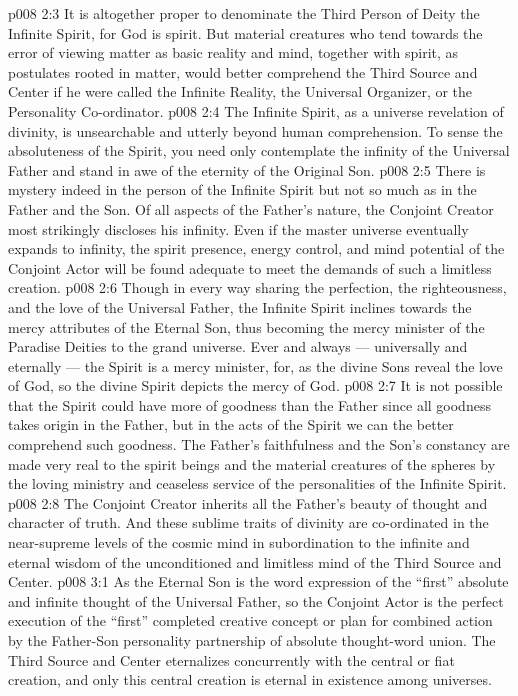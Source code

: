 \vs p008 2:3 It is altogether proper to denominate the Third Person of Deity the Infinite Spirit, for God is spirit. But material creatures who tend towards the error of viewing matter as basic reality and mind, together with spirit, as postulates rooted in matter, would better comprehend the Third Source and Center if he were called the Infinite Reality, the Universal Organizer, or the Personality Co\hyp{}ordinator.
\vs p008 2:4 \pc The Infinite Spirit, as a universe revelation of divinity, is unsearchable and utterly beyond human comprehension. To sense the absoluteness of the Spirit, you need only contemplate the infinity of the Universal Father and stand in awe of the eternity of the Original Son.
\vs p008 2:5 \pc There is mystery indeed in the person of the Infinite Spirit but not so much as in the Father and the Son. Of all aspects of the Father’s nature, the Conjoint Creator most strikingly discloses his infinity. Even if the master universe eventually expands to infinity, the spirit presence, energy control, and mind potential of the Conjoint Actor will be found adequate to meet the demands of such a limitless creation.
\vs p008 2:6 Though in every way sharing the perfection, the righteousness, and the love of the Universal Father, the Infinite Spirit inclines towards the mercy attributes of the Eternal Son, thus becoming the mercy minister of the Paradise Deities to the grand universe. Ever and always --- universally and eternally --- the Spirit is a mercy minister, for, as the divine Sons reveal the love of God, so the divine Spirit depicts the mercy of God.
\vs p008 2:7 It is not possible that the Spirit could have more of goodness than the Father since all goodness takes origin in the Father, but in the acts of the Spirit we can the better comprehend such goodness. The Father’s faithfulness and the Son’s constancy are made very real to the spirit beings and the material creatures of the spheres by the loving ministry and ceaseless service of the personalities of the Infinite Spirit.
\vs p008 2:8 The Conjoint Creator inherits all the Father’s beauty of thought and character of truth. And these sublime traits of divinity are co\hyp{}ordinated in the near\hyp{}supreme levels of the cosmic mind in subordination to the infinite and eternal wisdom of the unconditioned and limitless mind of the Third Source and Center.
\vs p008 3:1 As the Eternal Son is the word expression of the “first” absolute and infinite thought of the Universal Father, so the Conjoint Actor is the perfect execution of the “first” completed creative concept or plan for combined action by the Father\hyp{}Son personality partnership of absolute thought\hyp{}word union. The Third Source and Center eternalizes concurrently with the central or fiat creation, and only this central creation is eternal in existence among universes.
